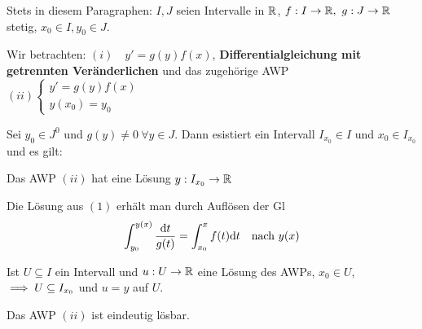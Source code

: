\documentclass[a4paper,twoside,DIV15,BCOR12mm]{scrbook}
\begin{document}

Stets in diesem Paragraphen: $I, J$ seien Intervalle in $\mathbb{R}$, $f:I\to\mathbb{R},\ g:J\to\mathbb{R}$ stetig, $x_0\in I, y_0\in J$.

Wir betrachten: $(i)\quad y'=g(y)f(x)$, \textbf{Differentialgleichung mit getrennten Veränderlichen} und das zugehörige AWP $(ii) \begin{cases}y'=g(y)f(x)\\y(x_0)=y_0 \end{cases}$

\begin{satz}
Sei $y_0\in J^0$ und $g(y)\ne 0\ \forall y\in J$. Dann esistiert ein Intervall $I_{x_0}\in I$ und $x_0 \in I_{x_0}$ und es gilt:

\begin{liste}
\item Das AWP $(ii)$ hat eine Lösung $y:I_{x_0}\to\mathbb{R}$
\item Die Lösung aus $(1)$ erhält man durch Auflösen der Gl $$\int_{y_0}^{y(x)} \frac{\mathrm{d} t}{g(t)} = \int_{x_0}^{x} f(t) \mathrm{d} t \text{\quad nach } y(x) $$ 
\item Ist $U\subseteq I$ ein Intervall und $u:U\to \mathbb{R}$ eine Lösung des AWPs, $x_0 \in U$, $\implies U\subseteq I_{x_0}$ und $u=y$ auf $U$.
\item Das AWP $(ii)$ ist eindeutig lösbar.
\end{liste}
\end{satz}
\end{document}
